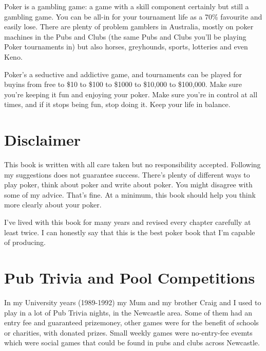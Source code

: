 Poker is a gambling game: a game with a skill component certainly but
still a gambling game. You can be all-in for your tournament life
as a 70\% favourite and easily lose. There are plenty of problem gamblers
in Australia, mostly on poker machines in the Pubs and Clubs
(the same Pubs and Clubs you'll be playing Poker tournaments
in) but also horses, greyhounds, sports, lotteries and even Keno.

Poker's a seductive and addictive game, and tournaments can be played
for buyins from free to \$10 to \$100 to \$1000 to \$10,000 to
\$100,000. Make sure you're keeping it fun and enjoying your
poker. Make sure you're in control at all times, and if it stops being
fun, stop doing it. Keep your life in balance.


\section{Disclaimer}

This book is written with all care taken but no responsibility accepted.
Following my suggestions does not guarantee success. There's plenty of
different ways to play poker, think about poker and write about
poker. You might disagree with some of my advice. That's fine. At a
minimum, this book should help you think more clearly about your
poker.

I've lived with this book for many years and revised every chapter
carefully at least twice. I can honestly say that this is the best
poker book that I'm capable of producing.

\section{Pub Trivia and Pool Competitions}

In my University years (1989-1992) my Mum and my brother Craig and I
used to play in a lot of Pub Trivia nights, in the Newcastle
area. Some of them had an entry fee and guaranteed prizemoney, other
games were for the benefit of schools or charities, with donated
prizes. Small weekly games were no-entry-fee evemts which were
social games that could be found in pubs and clubs across Newcastle.

